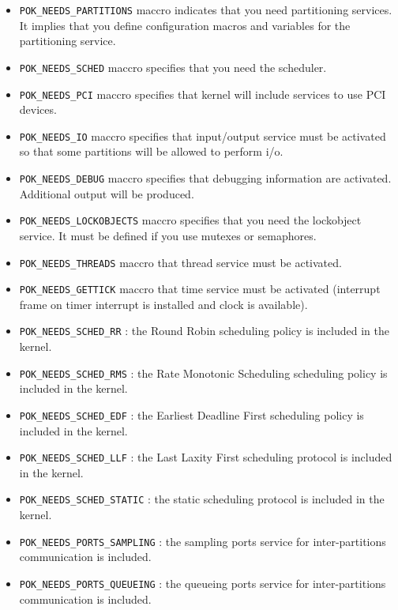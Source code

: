    \begin{itemize}
      \item
         \texttt{POK\_NEEDS\_PARTITIONS} maccro indicates that you need partitioning
         services. It implies that you define configuration macros and
         variables for the partitioning service.
      \item
         \texttt{POK\_NEEDS\_SCHED} maccro specifies that you need the
         scheduler.
      \item
         \texttt{POK\_NEEDS\_PCI} maccro specifies that kernel will include
         services to use PCI devices.
      \item
         \texttt{POK\_NEEDS\_IO} maccro specifies that input/output service must
         be activated so that some partitions will be allowed to perform i/o.
      \item
         \texttt{POK\_NEEDS\_DEBUG} maccro specifies that debugging information
         are activated. Additional output will be produced.
      \item
         \texttt{POK\_NEEDS\_LOCKOBJECTS} maccro specifies that you need the
         lockobject service. It must be defined if you use mutexes or
         semaphores.
      \item
         \texttt{POK\_NEEDS\_THREADS} maccro that thread service must be
         activated.
      \item
         \texttt{POK\_NEEDS\_GETTICK} maccro that time service must be activated
         (interrupt frame on timer interrupt is installed and clock is available).
      \item
         \texttt{POK\_NEEDS\_SCHED\_RR} : the Round Robin scheduling policy is
         included in the kernel.
      \item
         \texttt{POK\_NEEDS\_SCHED\_RMS} : the Rate Monotonic Scheduling
         scheduling policy is included in the kernel.
      \item
         \texttt{POK\_NEEDS\_SCHED\_EDF} : the Earliest Deadline First
         scheduling policy is included in the kernel.
      \item
         \texttt{POK\_NEEDS\_SCHED\_LLF} : the Last Laxity First scheduling
         protocol is included in the kernel.
      \item
         \texttt{POK\_NEEDS\_SCHED\_STATIC} : the static scheduling protocol is
         included in the kernel.
      \item
         \texttt{POK\_NEEDS\_PORTS\_SAMPLING} : the sampling ports service for
         inter-partitions communication is included.
      \item
         \texttt{POK\_NEEDS\_PORTS\_QUEUEING} : the queueing ports service for
         inter-partitions communication is included.
   \end{itemize}

